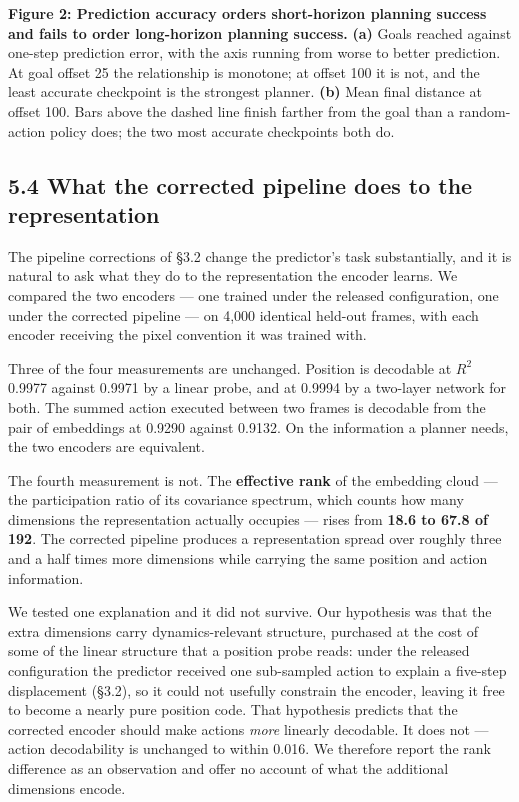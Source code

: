 \documentclass[10pt]{article}
\begin{document}
\medskip\noindent
\textbf{Figure 2: Prediction accuracy orders short-horizon planning success and fails to order long-horizon planning success.} \textbf{(a)} Goals reached against
one-step prediction error, with the axis running from worse to better
prediction. At goal offset 25 the relationship is monotone; at offset 100 it
is not, and the least accurate checkpoint is the strongest planner. \textbf{(b)}
Mean final distance at offset 100. Bars above the dashed line finish farther
from the goal than a random-action policy does; the two most accurate
checkpoints both do.
\medskip

\subsection{5.4 What the corrected pipeline does to the representation}\label{what-the-corrected-pipeline-does-to-the-representation}

The pipeline corrections of \S{}3.2 change the predictor's task substantially, and
it is natural to ask what they do to the representation the encoder learns. We
compared the two encoders --- one trained under the released configuration, one
under the corrected pipeline --- on 4,000 identical held-out frames, with each
encoder receiving the pixel convention it was trained with.

Three of the four measurements are unchanged. Position is decodable at $R^{2}$ 0.9977
against 0.9971 by a linear probe, and at 0.9994 by a two-layer network for
both. The summed action executed between two frames is decodable from the
pair of embeddings at 0.9290 against 0.9132. On the information a planner needs,
the two encoders are equivalent.

The fourth measurement is not. The \textbf{effective rank} of the embedding cloud ---
the participation ratio of its covariance spectrum, which counts how many
dimensions the representation actually occupies --- rises from \textbf{18.6 to 67.8 of
192}. The corrected pipeline produces a representation spread over roughly
three and a half times more dimensions while carrying the same position and
action information.

We tested one explanation and it did not survive. Our hypothesis was that the
extra dimensions carry dynamics-relevant structure, purchased at the cost of
some of the linear structure that a position probe reads: under the released
configuration the predictor received one sub-sampled action to explain a
five-step displacement (\S{}3.2), so it could not usefully constrain the encoder,
leaving it free to become a nearly pure position code. That hypothesis predicts
that the corrected encoder should make actions \emph{more} linearly decodable. It
does not --- action decodability is unchanged to within 0.016. We therefore report
the rank difference as an observation and offer no account of what the
additional dimensions encode.
\end{document}
